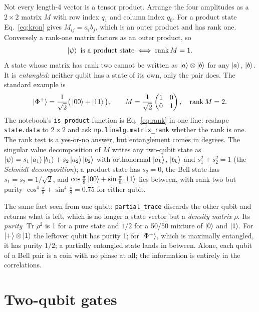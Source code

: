 \documentclass[11pt]{article}
\newcommand{\code}[1]{\texttt{#1}}
\begin{document}
Not every length-4 vector is a tensor product. Arrange the four amplitudes as a $2\times2$ matrix $M$ with row index $q_1$ and column index $q_0$. For a product state Eq.~\eqref{eq:kron} gives $M_{ij} = a_i b_j$, which is an outer product and has rank one. Conversely a rank-one matrix factors as an outer product, so
\begin{equation}
\ket{\psi} \text{ is a product state} \iff \operatorname{rank} M = 1 .
\label{eq:rank}
\end{equation}
A state whose matrix has rank two cannot be written as $\ket{a}\otimes\ket{b}$ for any $\ket{a}$, $\ket{b}$. It is \emph{entangled}: neither qubit has a state of its own, only the pair does. The standard example is
\begin{equation}
\ket{\Phi^+} = \frac{1}{\sqrt2}\big(\ket{00} + \ket{11}\big), \qquad
M = \frac{1}{\sqrt2}\begin{pmatrix}1&0\\0&1\end{pmatrix}, \quad \operatorname{rank} M = 2 .
\label{eq:bell}
\end{equation}
The notebook's \code{is\_product} function is Eq.~\eqref{eq:rank} in one line: reshape \code{state.data} to $2\times2$ and ask \code{np.linalg.matrix\_rank} whether the rank is one. The rank test is a yes-or-no answer, but entanglement comes in degrees. The singular value decomposition of $M$ writes any two-qubit state as $\ket{\psi} = s_1\ket{a_1}\ket{b_1} + s_2\ket{a_2}\ket{b_2}$ with orthonormal $\ket{a_k}$, $\ket{b_k}$ and $s_1^2 + s_2^2 = 1$ (the \emph{Schmidt decomposition}); a product state has $s_2 = 0$, the Bell state has $s_1 = s_2 = 1/\sqrt2$, and $\cos\frac\pi8\ket{00} + \sin\frac\pi8\ket{11}$ lies between, with rank two but purity $\cos^4\frac\pi8 + \sin^4\frac\pi8 = 0.75$ for either qubit.

The same fact seen from one qubit: \code{partial\_trace} discards the other qubit and returns what is left, which is no longer a state vector but a \emph{density matrix} $\rho$. Its \emph{purity} $\operatorname{Tr}\rho^2$ is 1 for a pure state and $1/2$ for a 50/50 mixture of $\ket{0}$ and $\ket{1}$. For $\ket{+}\otimes\ket{1}$ the leftover qubit has purity 1; for $\ket{\Phi^+}$, which is maximally entangled, it has purity $1/2$; a partially entangled state lands in between. Alone, each qubit of a Bell pair is a coin with no phase at all; the information is entirely in the correlations.

\section{Two-qubit gates}
\end{document}
